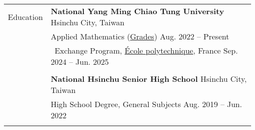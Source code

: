 \documentclass[letterpaper, 11pt]{article}
\begin{document}
\begin{center}
    \begin{longtable}{p{0.76in}p{5.93in}}

        
        
        
        \textcolor{OliveGreen}{Education} 
        & \textbf{National Yang Ming Chiao Tung University} \hfill Hsinchu City, Taiwan \\ 
        & Applied Mathematics (\href{https://docs.google.com/spreadsheets/d/1hz9FwNdFio4EajAw5VN3lpa6QyxIE2GJ6FpHmMoSaaQ/edit?usp=sharing}{Grades}) \hfill Aug. 2022 -- Present \\
        & \qquad \  Exchange Program, \href{https://www.polytechnique.edu}{\'Ecole polytechnique}, France \hfill Sep. 2024 -- Jun. 2025 \\
        & \\
        
        & \textbf{National Hsinchu Senior High School} \hfill Hsinchu City, Taiwan \\
        & High School Degree, General Subjects \hfill Aug. 2019 -- Jun. 2022\\
        & \\
        
        

\end{longtable}
\end{center}
\end{document}
